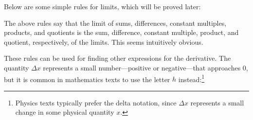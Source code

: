 Below are some simple rules for limits, which will be proved later:


The above rules say that the limit of sums, differences, constant multiples,
products, and quotients is the sum, difference, constant multiple,
product, and quotient, respectively, of the limits. This seems intuitively
obvious.

These rules can be used for finding other expressions for the derivative. The
quantity $\Delta x$ represents a small number---positive or negative---that
approaches 0, but it is common in mathematics texts to use the letter $h$
instead:\footnote{Physics texts typically prefer the delta notation, since
$\Delta x$ represents a small change in some physical quantity $x$.}

